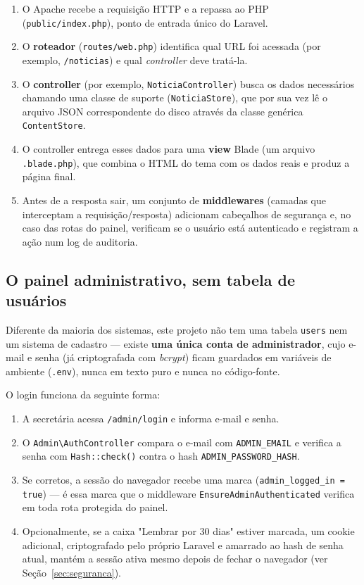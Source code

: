 \documentclass[11pt,a4paper]{article}
\begin{document}
\begin{enumerate}[leftmargin=2em]
    \item O Apache recebe a requisição HTTP e a repassa ao PHP (\texttt{public/index.php}),
          ponto de entrada único do Laravel.
    \item O \textbf{roteador} (\texttt{routes/web.php}) identifica qual URL foi acessada (por
          exemplo, \texttt{/noticias}) e qual \emph{controller} deve tratá-la.
    \item O \textbf{controller} (por exemplo, \texttt{NoticiaController}) busca os dados
          necessários chamando uma classe de suporte (\texttt{NoticiaStore}), que por sua vez lê
          o arquivo JSON correspondente do disco através da classe genérica
          \texttt{ContentStore}.
    \item O controller entrega esses dados para uma \textbf{view} Blade (um arquivo
          \texttt{.blade.php}), que combina o HTML do tema com os dados reais e produz a página
          final.
    \item Antes de a resposta sair, um conjunto de \textbf{middlewares} (camadas que interceptam
          a requisição/resposta) adicionam cabeçalhos de segurança e, no caso das rotas do
          painel, verificam se o usuário está autenticado e registram a ação num log de
          auditoria.
\end{enumerate}

\subsection{O painel administrativo, sem tabela de usuários}

Diferente da maioria dos sistemas, este projeto não tem uma tabela \texttt{users} nem um sistema
de cadastro — existe \textbf{uma única conta de administrador}, cujo e-mail e senha (já
criptografada com \emph{bcrypt}) ficam guardados em variáveis de ambiente (\texttt{.env}), nunca
em texto puro e nunca no código-fonte.

O login funciona da seguinte forma:

\begin{enumerate}[leftmargin=2em]
    \item A secretária acessa \texttt{/admin/login} e informa e-mail e senha.
    \item O \texttt{Admin\textbackslash AuthController} compara o e-mail com
          \texttt{ADMIN\_EMAIL} e verifica a senha com \texttt{Hash::check()} contra o hash
          \texttt{ADMIN\_PASSWORD\_HASH}.
    \item Se corretos, a sessão do navegador recebe uma marca (\texttt{admin\_logged\_in = true})
          — é essa marca que o middleware \texttt{EnsureAdminAuthenticated} verifica em toda
          rota protegida do painel.
    \item Opcionalmente, se a caixa "Lembrar por 30 dias" estiver marcada, um cookie adicional,
          criptografado pelo próprio Laravel e amarrado ao hash de senha atual, mantém a sessão
          ativa mesmo depois de fechar o navegador (ver Seção~\ref{sec:seguranca}).
\end{enumerate}
\end{document}
